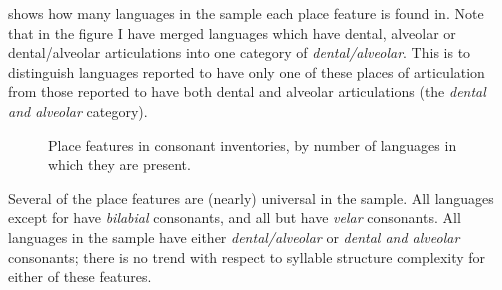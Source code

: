    shows how many languages in the sample each place feature is found in. Note that in the figure I have merged languages which have dental, alveolar or dental/alveolar articulations into one category of \textit{dental/alveolar}. This is to distinguish languages reported to have only one of these places of articulation from those reported to have both dental and alveolar articulations (the \textit{dental and alveolar} category).


\begin{figure}
\caption{\label{fig:4.7}Place features in consonant inventories, by number of languages in which they are present.}
\end{figure}

  Several of the place features are (nearly) universal in the sample. All languages except for  have \textit{bilabial} consonants, and all but  have \textit{velar} consonants. All languages in the sample have either \textit{dental/alveolar} or \textit{dental and alveolar} consonants; there is no trend with respect to syllable structure complexity for either of these features.

